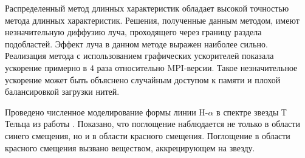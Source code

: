 Распределенный метод длинных характеристик обладает высокой точностью метода длинных характеристик. Решения, полученные данным методом, имеют незначительную диффузию луча, проходящего через границу раздела подобластей. Эффект луча в данном методе выражен наиболее сильно. Реализация метода с использованием графических ускорителей показала ускорение примерно в $4$ раза относительно MPI-версии. Такое незначительное ускорение может быть объяснено случайным доступом к памяти и плохой балансировкой загрузки нитей.

Проведено численное моделирование формы линии H-$\alpha$ в спектре звезды Т Тельца из работы \cite{romanova2009}. Показано, что  поглощение наблюдается не только в области синего смещения, но и в области красного смещения. Поглощение в области красного смещения вызвано веществом, аккрецирующем на звезду.
